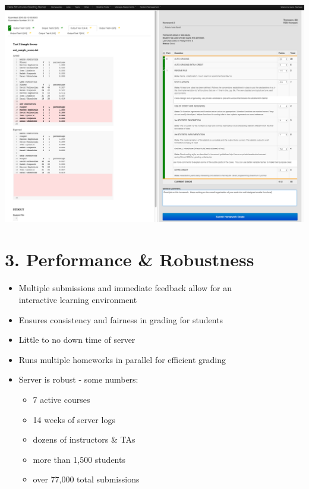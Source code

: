 \documentclass[thesis]{hmcposter}
\begin{document}
\begin{poster}
    \begin{center}
        \includegraphics[width=12in]{tagrading_screenshot}
    \end{center}
        

\columnbreak

\section{3. Performance \& Robustness}%
    \begin{itemize}
        \item Multiple submissions and immediate feedback allow for an \\ interactive learning environment
        \item Ensures consistency and fairness in grading for students
        \item Little to no down time of server
        \item Runs multiple homeworks in parallel for efficient grading
        \item Server is robust - some numbers:
          \begin{itemize}
            \item 7 active courses 
            \item 14 weeks of server logs
            \item dozens of instructors \& TAs
            \item more than 1,500 students
            \item over 77,000 total submissions
    \end{itemize}
    \end{itemize}
    

\end{poster}
\end{document}
